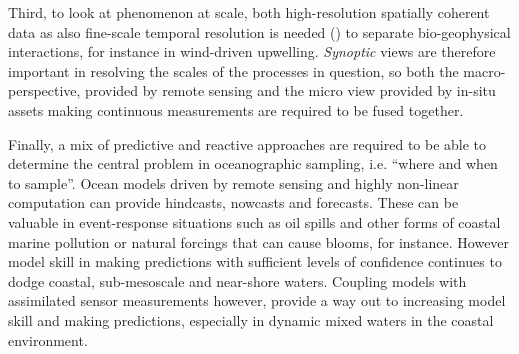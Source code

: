 \documentclass[12pt]{article}
\begin{document}
Third, to look at phenomenon at scale, both high-resolution spatially
coherent data as also fine-scale temporal resolution is needed
() to separate bio-geophysical interactions, for instance in
wind-driven upwelling. \emph{Synoptic} views are therefore important
in resolving the scales of the processes in question, so both the
macro- perspective, provided by remote sensing and the micro view
provided by in-situ assets making continuous measurements are required
to be fused together.

Finally, a mix of predictive and reactive approaches are required to
be able to determine the central problem in oceanographic sampling,
i.e. ``where and when to sample''. Ocean models driven by remote
sensing and highly non-linear computation can provide hindcasts,
nowcasts and forecasts. These can be valuable in event-response
situations such as oil spills and other forms of coastal marine
pollution or natural forcings that can cause blooms, for
instance. However model skill in making predictions with sufficient
levels of confidence continues to dodge coastal, sub-mesoscale and
near-shore waters. Coupling models with assimilated sensor
measurements however, provide a way out to increasing model skill and
making predictions, especially in dynamic mixed waters in the coastal
environment.
\end{document}
